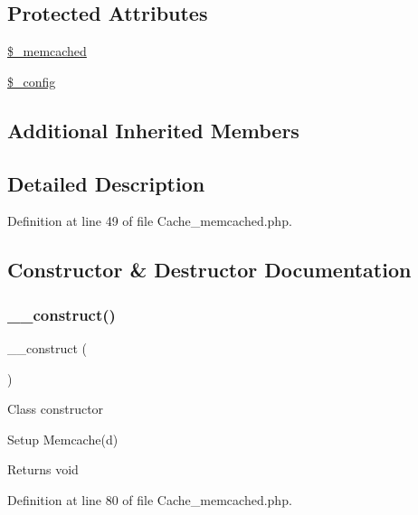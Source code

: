 \subsection*{Protected Attributes}
\begin{DoxyCompactItemize}
\item 
\mbox{\hyperlink{class_c_i___cache__memcached_a9ce5188201bbc41ed4374947a35dadcc}{\$\+\_\+memcached}}
\item 
\mbox{\hyperlink{class_c_i___cache__memcached_a4d4ad4af1600438042f93a4492f8dbbe}{\$\+\_\+config}}
\end{DoxyCompactItemize}
\subsection*{Additional Inherited Members}


\subsection{Detailed Description}


Definition at line 49 of file Cache\+\_\+memcached.\+php.



\subsection{Constructor \& Destructor Documentation}
\mbox{\label{class_c_i___cache__memcached_a095c5d389db211932136b53f25f39685}} 
\subsubsection{\texorpdfstring{\_\_construct()}{\_\_construct()}}
{\footnotesize\ttfamily \+\_\+\+\_\+construct (\begin{DoxyParamCaption}{ }\end{DoxyParamCaption})}

Class constructor

Setup Memcache(d)

\begin{DoxyReturn}{Returns}
void 
\end{DoxyReturn}


Definition at line 80 of file Cache\+\_\+memcached.\+php.

